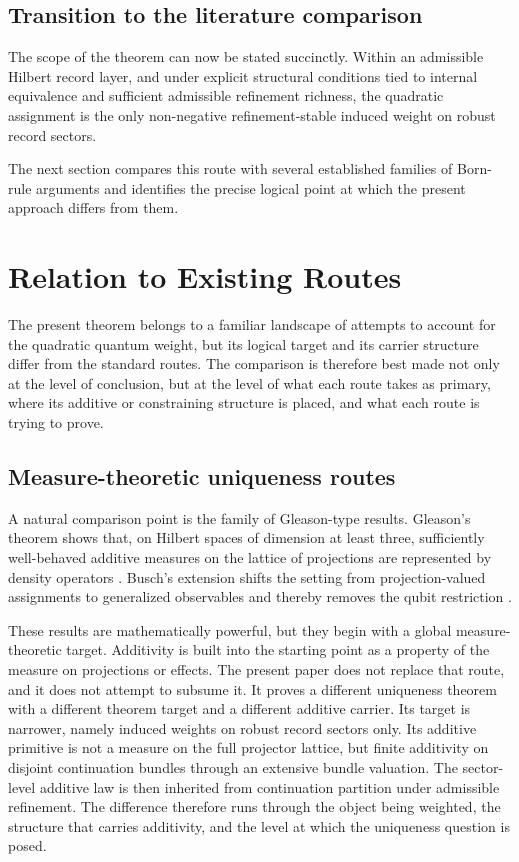 \documentclass[11pt]{article}
\theoremstyle{remark}
\numberwithin{equation}{section}
\begin{document}
\subsection{Transition to the literature comparison}

The scope of the theorem can now be stated succinctly. Within an admissible Hilbert record layer, and under explicit structural conditions tied to internal equivalence and sufficient admissible refinement richness, the quadratic assignment is the only non-negative refinement-stable induced weight on robust record sectors.

The next section compares this route with several established families of Born-rule arguments and identifies the precise logical point at which the present approach differs from them.
\section{Relation to Existing Routes}
\label{sec:existing-routes}

The present theorem belongs to a familiar landscape of attempts to account for the quadratic quantum weight, but its logical target and its carrier structure differ from the standard routes. The comparison is therefore best made not only at the level of conclusion, but at the level of what each route takes as primary, where its additive or constraining structure is placed, and what each route is trying to prove.

\subsection{Measure-theoretic uniqueness routes}

A natural comparison point is the family of Gleason-type results. Gleason's theorem shows that, on Hilbert spaces of dimension at least three, sufficiently well-behaved additive measures on the lattice of projections are represented by density operators \cite{Gleason1957}. Busch's extension shifts the setting from projection-valued assignments to generalized observables and thereby removes the qubit restriction \cite{Busch2003}.

These results are mathematically powerful, but they begin with a global measure-theoretic target. Additivity is built into the starting point as a property of the measure on projections or effects. The present paper does not replace that route, and it does not attempt to subsume it. It proves a different uniqueness theorem with a different theorem target and a different additive carrier. Its target is narrower, namely induced weights on robust record sectors only. Its additive primitive is not a measure on the full projector lattice, but finite additivity on disjoint continuation bundles through an extensive bundle valuation. The sector-level additive law is then inherited from continuation partition under admissible refinement. The difference therefore runs through the object being weighted, the structure that carries additivity, and the level at which the uniqueness question is posed.
\end{document}
